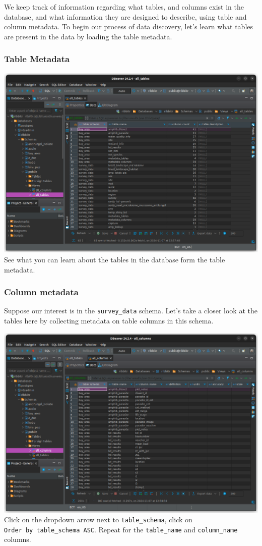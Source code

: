 \documentclass[
  letterpaper,
  DIV=11,
  numbers=noendperiod]{scrartcl}
\begin{document}
We keep track of information regarding what tables, and columns exist in
the database, and what information they are designed to describe, using
table and column metadata. To begin our process of data discovery, let's
learn what tables are present in the data by loading the table metadata.

\subsubsection{Table Metadata}\label{table-metadata-2}

\includegraphics{images/DBeaver_data_discovery_02.png} See what you can
learn about the tables in the database form the table metadata.

\subsubsection{Column metadata}\label{column-metadata-2}

Suppose our interest is in the \texttt{survey\_data} schema. Let's take
a closer look at the tables here by collecting metadata on table columns
in this schema.

\includegraphics{images/DBeaver_data_discovery_03.png} Click on the
dropdown arrow next to \texttt{table\_schema}, click on
\texttt{Order\ by\ table\_schema\ ASC}. Repeat for the
\texttt{table\_name} and \texttt{column\_name} columns.
\end{document}
